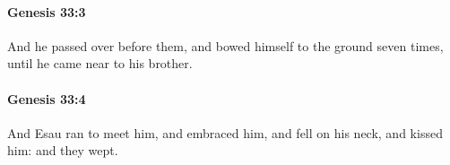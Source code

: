 		\paragraph{Genesis 33:3} %
			\label{GENESIS-33-3}

			And he passed over before them, and bowed himself to the ground seven times, until he came near to his brother.


		\paragraph{Genesis 33:4} %
			\label{GENESIS-33-4}

			And Esau ran to meet him, and embraced him, and fell on his neck, and kissed him: and they wept.


